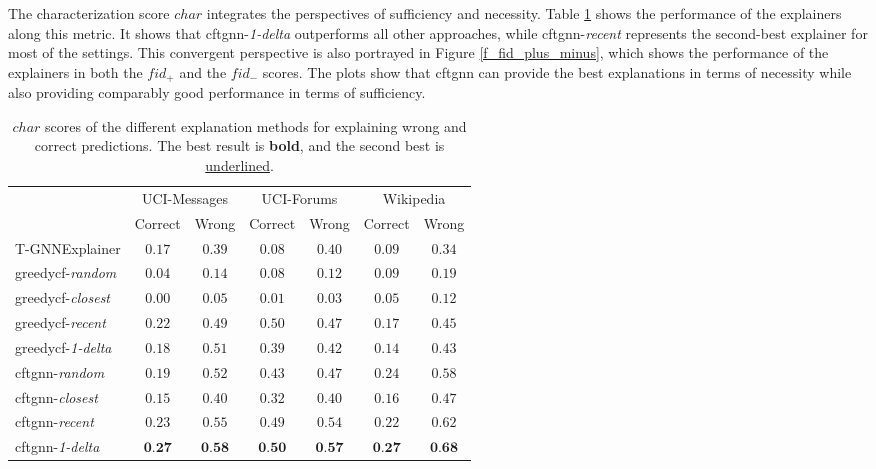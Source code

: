 The characterization score $char$ integrates the perspectives of sufficiency and necessity. Table \ref{t_char} shows the performance of the explainers along this metric. It shows that \gls{cftgnn}-\textit{1-delta} outperforms all other approaches, while \gls{cftgnn}-\textit{recent} represents the second-best explainer for most of the settings. This convergent perspective is also portrayed in Figure \ref{f_fid_plus_minus}, which shows the performance of the explainers in both the $fid_+$ and the $fid_-$ scores. The plots show that \gls{cftgnn} can provide the best explanations in terms of necessity while also providing comparably good performance in terms of sufficiency. 


\begin{table}[ht]
    \centering
    \small
    \begin{tabular}{lcccccc}
    \hline
         &  \multicolumn{2}{c}{UCI-Messages}&  \multicolumn{2}{c}{UCI-Forums}&  \multicolumn{2}{c}{Wikipedia}\\
         &  Correct&  Wrong&  Correct&  Wrong&  Correct& Wrong\\
         \hline
         T-GNNExplainer&  $0.17$&  $0.39$&  $0.08$&  $0.40$&  $0.09$& $0.34$\\
         \gls{greedycf}-\textit{random}&  $0.04$&  $0.14$&  $0.08$&  $0.12$&  $0.09$& $0.19$\\
         \gls{greedycf}-\textit{closest}&  $0.00$&  $0.05$&  $0.01$&  $0.03$&  $0.05$& $0.12$\\
         \gls{greedycf}-\textit{recent}&  $0.22$&  $0.49$&  \underline{$0.50$}&  $0.47$&  $0.17$& $0.45$\\
         \gls{greedycf}-\textit{1-delta}&  $0.18$&  $0.51$&  $0.39$&  $0.42$&  $0.14$& $0.43$\\
         \gls{cftgnn}-\textit{random}&  $0.19$&  $0.52$&  $0.43$&  $0.47$&  \underline{$0.24$}& $0.58$\\
         \gls{cftgnn}-\textit{closest}&  $0.15$&  $0.40$&  $0.32$&  $0.40$&  $0.16$& $0.47$\\
         \gls{cftgnn}-\textit{recent}&  \underline{$0.23$}&  \underline{$0.55$}&  $0.49$&  \underline{$0.54$}&  $0.22$& \underline{$0.62$}\\
 \gls{cftgnn}-\textit{1-delta}& $\textbf{0.27}$& $\textbf{0.58}$& $\textbf{0.50}$& $\textbf{0.57}$& $\textbf{0.27}$&$\textbf{0.68}$\\
 \hline
    \end{tabular}
    \caption{$char$ scores of the different explanation methods for explaining wrong and correct predictions. The best result is \textbf{bold}, and the second best is \underline{underlined}.}
    \label{t_char}
\end{table}


